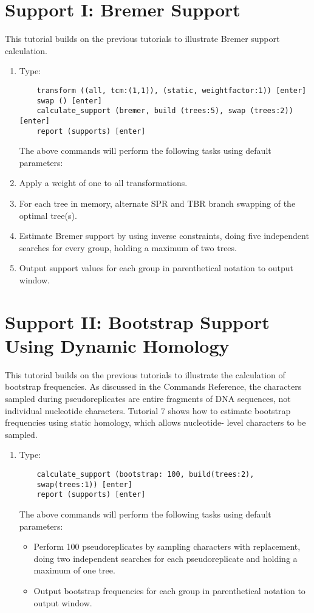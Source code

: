 \section[Bremer Support]{Support I: Bremer Support}

This tutorial builds on the previous tutorials to illustrate Bremer support 
calculation.
\begin{enumerate}
\item Type: 
    \begin{verbatim}
    transform ((all, tcm:(1,1)), (static, weightfactor:1)) [enter]
    swap () [enter]
    calculate_support (bremer, build (trees:5), swap (trees:2)) [enter]
    report (supports) [enter]
    \end{verbatim}

The above commands will perform the following tasks using default parameters:
\item Apply a weight of one to all transformations.
\item For each tree in memory, alternate SPR and TBR branch swapping of the 
optimal tree(s).
\item Estimate Bremer support by using inverse constraints, doing five 
independent searches for every group, holding a maximum of two trees. 
\item Output support values for each group in parenthetical notation to \poy 
output window.

\end{enumerate}

\section[Bootstrap Support]{Support II: Bootstrap Support Using Dynamic Homology}

This tutorial builds on the previous tutorials to illustrate the calculation of 
bootstrap frequencies. As discussed in the \poy Commands Reference, the 
characters sampled during pseudoreplicates are entire fragments of DNA 
sequences, not individual nucleotide characters. Tutorial 7 shows how to 
estimate bootstrap frequencies using static homology, which allows nucleotide-
level characters to be sampled. 

\begin{enumerate}
\item Type:
    \begin{verbatim}
    calculate_support (bootstrap: 100, build(trees:2), 
    swap(trees:1)) [enter]
    report (supports) [enter]
    \end{verbatim}

The above commands will perform the following tasks using default parameters:
\begin{itemize}
\item Perform 100 pseudoreplicates by sampling characters with replacement, 
doing two independent searches for each pseudoreplicate and holding a 
maximum of one tree. 
\item Output bootstrap frequencies for each group in parenthetical notation to 
\poy output window.
\end{itemize}
\end{enumerate}

